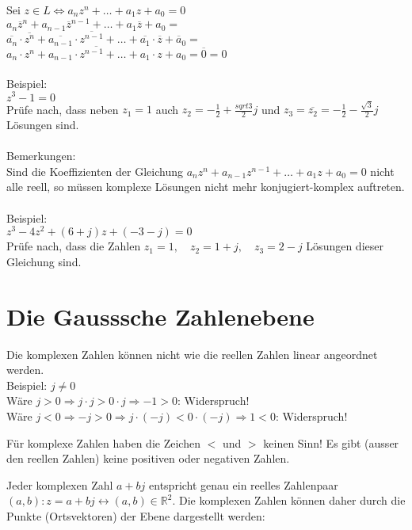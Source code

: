 Sei $z \in L \Leftrightarrow a_n z^n + \dots + a_1 z + a_0 = 0$\\
$a_n \overline{z}^n + a_{n-1} \overline{z}^{n-1} + \dots + a_1 \overline{z} + a_0 = $\\
$\overline{a_n} \cdot \overline{z^n} + \overline{a_{n-1}} \cdot \overline{z^{n-1}} + \dots + \overline{a_1} \cdot \overline{z} + \overline a_0 = $\\
$\overline{a_n \cdot z^n + a_{n-1} \cdot z^{n-1} + \dots + a_1 \cdot z + a_0} = \overline{0} = 0$\\\\
Beispiel: \\
$z^3 - 1 = 0$ \\
Prüfe nach, dass neben $z_1 = 1$ auch $z_2 = -\frac{1}{2} + \frac{sqrt{3}}{2} j$ und $z_3 = \overline{z_2} = -\frac{1}{2} - \frac{\sqrt{3}}{2} j$ Lösungen sind. \\\\
Bemerkungen: \\
Sind die Koeffizienten der Gleichung $a_n z^n + a_{n-1} z^{n-1} + \dots + a_1 z + a_0 = 0$ nicht alle reell, so müssen komplexe Lösungen nicht mehr konjugiert-komplex auftreten. \\\\
Beispiel: \\
$z^3 - 4 z^2 + (6 + j) z + (-3 - j) = 0$\\
Prüfe nach, dass die Zahlen $z_1 = 1, \quad z_2 = 1 + j, \quad z_3 = 2 - j$ Lösungen dieser Gleichung sind. 

\section{Die Gausssche Zahlenebene}
Die komplexen Zahlen können nicht wie die reellen Zahlen  linear angeordnet werden. \\
Beispiel: $j \neq 0$\\
Wäre $j > 0 \Rightarrow j \cdot j > 0 \cdot j \Rightarrow -1 > 0$: Widerspruch!\\
Wäre $j < 0 \Rightarrow -j > 0 \Rightarrow j \cdot (-j) < 0 \cdot (-j) \Rightarrow 1 < 0$: Widerspruch!
\begin{framed}\noindent
  Für komplexe Zahlen haben die Zeichen $<$ und $>$ keinen Sinn! Es gibt (ausser den reellen Zahlen) keine positiven oder negativen Zahlen. 
\end{framed}\noindent
Jeder komplexen Zahl $a + b j$ entspricht genau ein reelles Zahlenpaar $(a, b): z = a + b j \leftrightarrow (a, b) \in \mathbb{R}^2$. Die komplexen Zahlen können daher durch die Punkte (Ortsvektoren) der Ebene dargestellt werden: 
